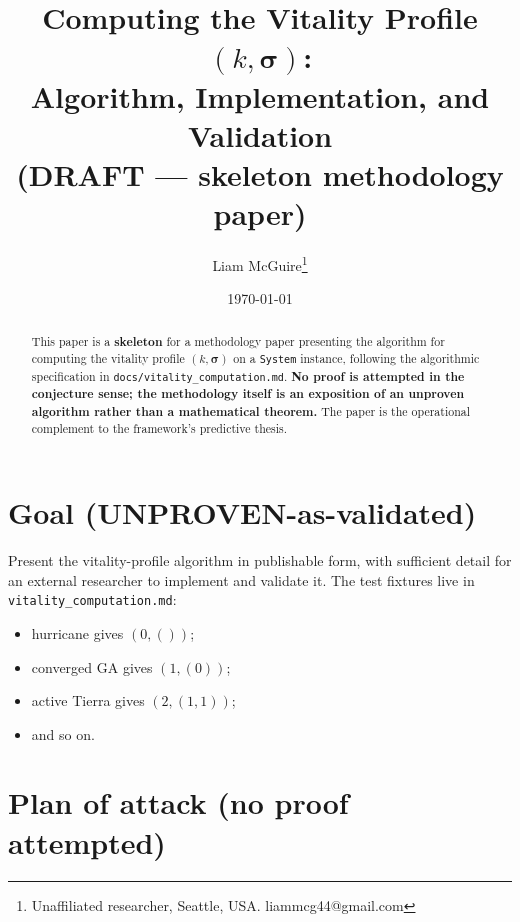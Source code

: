 \documentclass[11pt]{article}
\title{Computing the Vitality Profile $(k, \boldsymbol{\sigma})$: \\
       Algorithm, Implementation, and Validation \\
       \large (DRAFT --- skeleton methodology paper)}
\author{Liam McGuire\thanks{Unaffiliated researcher, Seattle, USA. liammcg44@gmail.com}}
\date{\today}
\theoremstyle{plain}
\theoremstyle{definition}
\begin{document}
\maketitle

\begin{abstract}
This paper is a \textbf{skeleton} for a methodology paper presenting
the algorithm for computing the vitality profile $(k, \boldsymbol{\sigma})$
on a \texttt{System} instance, following the algorithmic
specification in \texttt{docs/vitality\_computation.md}. \textbf{No
proof is attempted in the conjecture sense; the methodology itself is
an exposition of an unproven algorithm rather than a mathematical
theorem.} The paper is the operational complement to the framework's
predictive thesis.
\end{abstract}

\section{Goal (UNPROVEN-as-validated)}

Present the vitality-profile algorithm in publishable form, with
sufficient detail for an external researcher to implement and
validate it. The test fixtures live in
\texttt{vitality\_computation.md}:
%
\begin{itemize}[leftmargin=2em,itemsep=2pt]
  \item hurricane gives $(0, ())$;
  \item converged GA gives $(1, (0))$;
  \item active Tierra gives $(2, (1, 1))$;
  \item and so on.
\end{itemize}

\section{Plan of attack (no proof attempted)}
\end{document}
